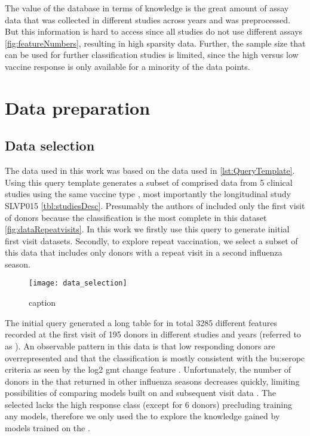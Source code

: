 The value of the database in terms of knowledge is the great amount of assay data that was collected in different studies across years and was preprocessed.
But this information is hard to access since all studies do not use different assays \autoref{fig:featureNumbers}, resulting in high sparsity data.
Further, the sample size that can be used for further classification studies is limited, since the high versus low vaccine response is only available for a minority of the data points.

\section{Data preparation}

\subsection{Data selection}

The data used in this work was based on the data used in \spaper \autoref{lst:QueryTemplate}.
Using this query template generates a subset of \flup comprised data from 5 clinical studies using the same vaccine type , most importantly the longitudinal study SLVP015 \autoref{tbl:studiesDesc}.
Presumably the authors of \spaper included only the first visit of donors because the classification is the most complete in this dataset \autoref{fig:dataRepeatvisits}.
In this work we firstly use this query to generate initial first visit datasets.
Secondly, to explore repeat vaccination, we select a subset of this data that includes only donors with a repeat visit in a second influenza season.

\begin{figure}[htpb]
    \texttt{[image: data\_selection]}
    \caption{caption}\label{fig:dataRepeatvisits}
\end{figure}

The initial query generated a long table for in total 3285 different features recorded at the first visit of 195 donors in different studies and years (referred to as \firstvis).
An observable pattern in this data is that low responding donors are overrepresented and that the classification is mostly consistent with the \gls{bu:seropc} criteria as seen by the log2 \acrshort{gmt} change feature .
Unfortunately, the number of donors in the \firstvis that returned in other influenza seasons decreases quickly, limiting possibilities of comparing models built on \firstvis and subsequent visit data .
The selected \secondvis lacks the high response class (except for 6 donors) precluding training any models, therefore we only used the \secondvis to explore the knowledge gained by models trained on the \firstvis {}.

